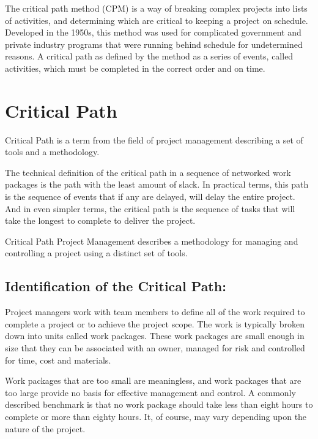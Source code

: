 The critical path method (CPM) is a way of breaking complex projects into lists of activities, and determining which are critical to keeping a project on schedule. Developed in the 1950s, this method was used for complicated government and private industry programs that were running behind schedule for undetermined reasons. A critical path as defined by the method as a series of events, called activities, which must be completed in the correct order and on time.


\section{Critical Path}


Critical Path is a term from the field of project management describing a set of tools and a methodology.

The technical definition of the critical path in a sequence of networked work packages is the path with the least amount of slack. In practical terms, this path is the sequence of events that if any are delayed, will delay the entire project. And in even simpler terms, the critical path is the sequence of tasks that will take the longest to complete to deliver the project.



Critical Path Project Management describes a methodology for managing and controlling a project using a distinct set of tools. 

\subsection{Identification of the Critical Path:}
Project managers work with team members to define all of the work required to complete a project or to achieve the project scope. The work is typically broken down into units called work packages. These work packages are small enough in size that they can be associated with an owner, managed for risk and controlled for time, cost and materials.

Work packages that are too small are meaningless, and work packages that are too large provide no basis for effective management and control. A commonly described benchmark is that no work package should take less than eight hours to complete or more than eighty hours. It, of course, may vary depending upon the nature of the project. 

